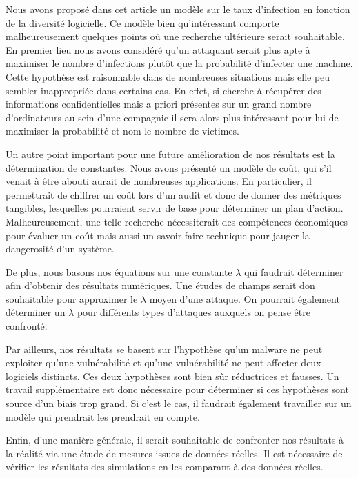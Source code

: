 Nous avons proposé dans cet article un modèle sur le taux d'infection en fonction de la diversité logicielle. Ce modèle bien
qu'intéressant comporte malheureusement quelques points où une recherche ultérieure serait souhaitable. En premier lieu nous avons
considéré qu'un attaquant serait plus apte à maximiser le nombre d'infections plutôt que la probabilité d'infecter une machine.
Cette hypothèse est raisonnable dans de nombreuses situations mais elle peu sembler inappropriée dans certains cas. En effet, si
cherche à récupérer des informations confidentielles mais a priori présentes sur un grand nombre d'ordinateurs au sein d'une
compagnie il sera alors plus intéressant pour lui de maximiser la probabilité et nom le nombre de victimes.
\newline

Un autre point important pour une future amélioration de nos résultats est la détermination de constantes. Nous avons présenté un
modèle de coût, qui s'il venait à être abouti aurait de nombreuses applications. En particulier, il permettrait de chiffrer un
coût lors d'un audit et donc de donner des métriques tangibles, lesquelles pourraient servir de base pour déterminer un plan
d'action. Malheureusement, une telle recherche nécessiterait des compétences économiques pour évaluer un coût mais aussi un
savoir-faire technique pour jauger la dangerosité d'un système.
\newline

De plus, nous basons nos équations sur une constante $\lambda$ qui faudrait déterminer afin d'obtenir des résultats numériques. Une
études de champs serait don souhaitable pour approximer le $\lambda$ moyen d'une attaque. On pourrait également déterminer un
$\lambda$ pour différents types d'attaques auxquels on pense être confronté.
\newline

Par ailleurs, nos résultats se basent sur l'hypothèse qu'un malware ne peut exploiter qu'une vulnérabilité et qu'une vulnérabilité
ne peut affecter deux logiciels distincts. Ces deux hypothèses sont bien sûr réductrices et fausses. Un travail supplémentaire est
donc nécessaire pour déterminer si ces hypothèses sont source d'un biais trop grand. Si c'est le cas, il faudrait également
travailler sur un modèle qui prendrait les prendrait en compte.

Enfin, d'une manière générale, il serait souhaitable de confronter nos résultats à la réalité via une étude de mesures issues de
données réelles. Il est nécessaire de vérifier les résultats des simulations en les comparant à des données réelles. 
